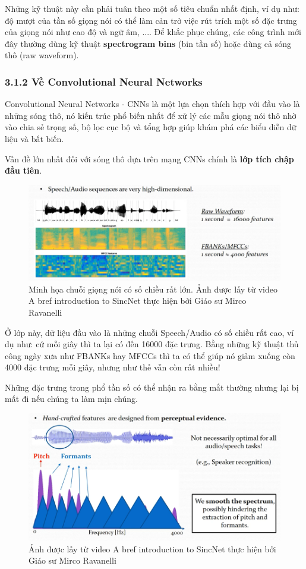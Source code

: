 \documentclass{article}
\begin{document}
	Những kỹ thuật này cần phải tuân theo một số tiêu chuẩn nhất định, ví dụ như: độ mượt của tần số giọng nói có thể làm cản trở việc rút trích một số đặc trưng của giọng nói như cao độ và ngữ âm, .... Để khắc phục chúng, các công trình mới đây thường dùng kỹ thuật \textbf{spectrogram bins} (bin tần số) hoặc dùng cả sóng thô (raw waveform).
	
	\subsubsection{3.1.2 Về Convolutional Neural Networks}
	\qquad Convolutional Neural Networks - CNNs là một lựa chọn thích hợp với đầu vào là những sóng thô, nó kiến trúc phổ biến nhất để xử lý các mẫu giọng nói thô nhờ vào chia sẻ trọng số, bộ lọc cục bộ và tổng hợp giúp khám phá các biểu diễn dữ liệu và bất biến.
	
	Vấn đề lớn nhất đối với sóng thô dựa trên mạng CNNs chính là \textbf{lớp tích chập đầu tiên}.
	\begin{figure}[H]
		\centering
		\includegraphics[width=1\textwidth]{images/capture_01.png}
		\caption{Minh họa chuỗi giọng nói có số chiều rất lớn. Ảnh được lấy từ video A bref introduction to SincNet thực hiện bởi Giáo sư Mirco Ravanelli}
		\label{fig:writing-thesis}
	\end{figure}
	Ở lớp này, dữ liệu đầu vào là những chuỗi Speech/Audio có số chiều rất cao, ví dụ như: cứ mỗi giây thì ta lại có đến 16000 đặc trưng. Bằng những kỹ thuật thủ công ngày xưa như FBANKs hay MFCCs thì ta có thể giúp nó giảm xuống còn 4000 đặc trưng mỗi giây, nhưng như thế vẫn còn rất nhiều!
	
	Những đặc trưng trong phổ tần số có thể nhận ra bằng mắt thường nhưng lại bị mất đi nếu chúng ta làm mịn chúng.
	\begin{figure}[H]
		\centering
		\includegraphics[width=1\textwidth]{images/perceptual_evidence.png}
		\caption{Ảnh được lấy từ video A bref introduction to SincNet thực hiện bởi Giáo sư Mirco Ravanelli}
		\label{fig:writing-thesis}
	\end{figure}
	
\end{document}
